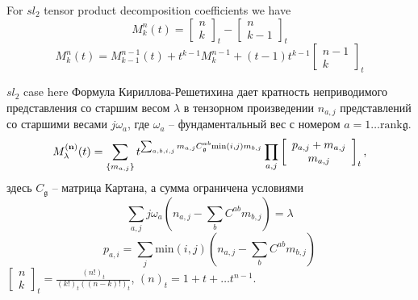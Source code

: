 \documentclass[12pt]{iopart}
\newcommand{\gf}{\mathfrak{g}}
\begin{document}
For $sl_{2}$ tensor product decomposition coefficients we have
\begin{equation}
  \label{eq:12}
  M^{n}_{k}(t)=\left[\begin{array}{c}n\\ k\end{array}\right]_{t}-\left[\begin{array}{c}n\\ k-1\end{array}\right]_{t}
\end{equation}
\begin{equation}
  \label{eq:13}
  M^{n}_{k}(t)=M^{n-1}_{k-1}(t)+t^{k-1}M^{n-1}_{k}+(t-1)t^{k-1}\left[\begin{array}{c}n-1\\ k\end{array}\right]_{t}
\end{equation}

$sl_2$ case here
Формула Кириллова-Решетихина дает кратность неприводимого представления со старшим весом $\lambda$ в
тензорном произведении  $n_{a,j}$ представлений со старшими весами $j\omega_{a}$, где $\omega_{a}$
-- фундаментальный вес с номером $a=1\dots \mathrm{rank}\gf$. 
\begin{equation}
  \label{eq:3}
  M^{(\bf{n})}_{\lambda}(t)=\sum_{\{m_{a,j}\}}t^{\sum_{a,b,i,j}m_{a,j}C_{\gf}^{ab}\mathrm{min}(i,j)m_{b,j}}\prod_{a,j}\left[\begin{array}{c}p_{a,j}+m_{a,j}\\ m_{a,j}\end{array}\right]_{t},
\end{equation}
здесь $C_{\gf}$ -- матрица Картана, а сумма ограничена условиями
\begin{equation}
  \label{eq:6}
  \sum_{a,j}j\omega_{a}(n_{a,j}-\sum_{b}C^{ab}m_{b,j})=\lambda
\end{equation}
\begin{equation}
  \label{eq:7}
  p_{a,i}=\sum_{j}\mathrm{min}(i,j) \left(n_{a,j}-\sum_{b}C^{ab}m_{b,j}\right)
\end{equation}
$\left[\begin{array}{c}n\\ k\end{array}\right]_{t}=\frac{(n!)_{t}}{(k!)_{t}((n-k)!)_{t}}$, $(n)_{t}=1+t+\dots t^{n-1}$.
\end{document}
